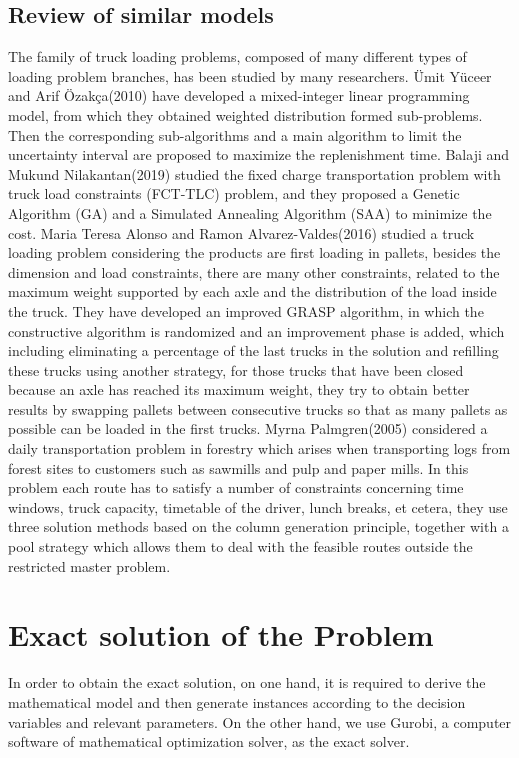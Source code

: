 \documentclass{article}
\begin{document}
\subsection{Review of similar models} 
The family of truck loading problems, composed of many different types of loading problem branches, has been studied by many researchers. Ümit Yüceer and Arif Özakça(2010) have developed a mixed-integer linear programming model, from which they obtained weighted distribution formed sub-problems. Then the corresponding sub-algorithms and a main algorithm to limit the uncertainty interval are proposed to maximize the replenishment time. Balaji and Mukund Nilakantan(2019) studied the fixed charge transportation problem with truck load constraints (FCT-TLC) problem, and they proposed a Genetic Algorithm (GA) and a Simulated Annealing Algorithm (SAA) to minimize the cost. Maria Teresa Alonso and Ramon Alvarez-Valdes(2016) studied a truck loading problem considering the products are first loading in pallets, besides the dimension and load constraints, there are many other constraints, related to the maximum weight supported by each axle and the distribution of the load inside the truck. They have developed an improved GRASP algorithm, in which the constructive algorithm is randomized and an improvement phase is added, which including eliminating a percentage of the last trucks in the solution and refilling these trucks using another strategy, for those trucks that have been closed because an axle has reached its maximum weight, they try to obtain better results by swapping pallets between consecutive trucks so that as many pallets as possible can be loaded in the first trucks. Myrna Palmgren(2005) considered a daily transportation problem in forestry which arises when transporting logs from forest sites to customers such as sawmills and pulp and paper mills. In this problem each route has to satisfy a number of constraints concerning time windows, truck capacity, timetable of the driver, lunch breaks, et cetera, they use three solution methods based on the column generation principle, together with a pool strategy which allows them to deal with the feasible routes outside the restricted master problem.


\section{Exact solution of the Problem}
\label{sec:exact}
In order to obtain the exact solution, on one hand, it is required to derive the mathematical model and then generate instances according to the decision variables and relevant parameters. On the other hand, we use Gurobi, a computer software of mathematical optimization solver, as the exact solver.
\end{document}
